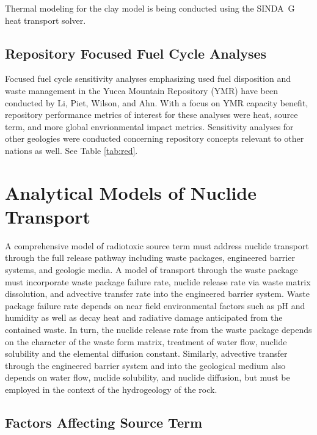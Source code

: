 Thermal modeling for the clay model is being conducted using the 
SINDA\ G heat transport solver.  

\subsection{Repository Focused Fuel Cycle Analyses}

Focused fuel cycle sensitivity analyses emphasizing used fuel 
disposition and waste management in the Yucca Mountain Repository 
(YMR) have been conducted by Li, Piet, Wilson, and Ahn. With a focus 
on YMR capacity benefit, repository performance metrics of interest 
for these analyses were heat, source term, and more global 
envrionmental impact metrics.  Sensitivity analyses for other 
geologies were conducted concerning repository concepts relevant to 
other nations as well. See Table \ref{tab:red}.

\section{Analytical Models of Nuclide Transport} 
\label{sec:analytical_nuc}


A comprehensive model of radiotoxic source term must address nuclide 
transport through the full release pathway including waste packages, 
engineered barrier systems, and geologic media. A model of transport 
through the waste package must incorporate waste package failure rate, 
nuclide release rate via waste matrix dissolution, and advective 
transfer rate into the engineered barrier system.  Waste package 
failure rate depends on near field environmental factors such as pH 
and humidity as well as decay heat and radiative damage anticipated 
from the contained waste.  In turn, the nuclide release rate from the 
waste package depends on the character of the waste form matrix, 
treatment of water flow, nuclide solubility and the elemental 
diffusion constant.  Similarly, advective transfer through the 
engineered barrier system and into the geological medium also depends 
on water flow, nuclide solubility, and nuclide diffusion, but must be 
employed in the context of the hydrogeology of the rock.   

\subsection{Factors Affecting Source Term}

